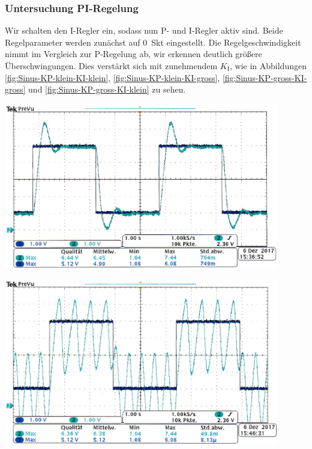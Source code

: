 \subsubsection*{Untersuchung PI-Regelung}
%
Wir schalten den I-Regler ein, sodass nun P- und I-Regler aktiv sind.
Beide Regelparameter werden zunächst auf \SI{0}{Skt} eingestellt.
Die Regelgeschwindigkeit nimmt im Vergleich zur P-Regelung ab, wir erkennen deutlich größere Überschwingungen.
Dies verstärkt sich mit zunehmendem $K_{\text{I}}$, wie in Abbildungen \ref{fig:Sinus-KP-klein-KI-klein}, \ref{fig:Sinus-KP-klein-KI-gross}, \ref{fig:Sinus-KP-gross-KI-gross} und \ref{fig:Sinus-KP-gross-KI-klein} zu sehen.
%
\par
%
\minipage{\linewidth}
    \begin{center}
        \captionsetup{type=figure}
        \begin{adjustbox}{max width=\linewidth, keepaspectratio}
            \includegraphics[width=120mm]{jpg/Sinus-KP-klein-KI-klein}
        \end{adjustbox}
        \label{fig:Sinus-KP-klein-KI-klein}
    \end{center}
\endminipage
%
\par
%
\minipage{\linewidth}
    \begin{center}
        \captionsetup{type=figure}
        \begin{adjustbox}{max width=\linewidth, keepaspectratio}
            \includegraphics[width=120mm]{jpg/Sinus-KP-klein-KI-gross}
        \end{adjustbox}
        \label{fig:Sinus-KP-klein-KI-gross}
    \end{center}
